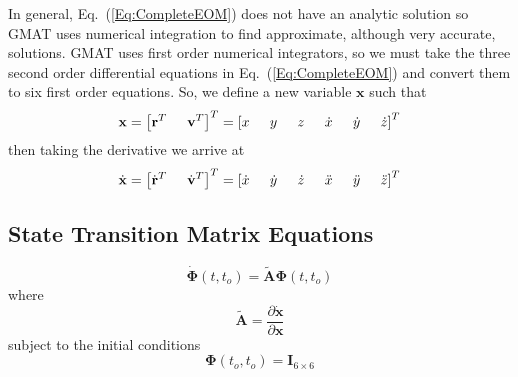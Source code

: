 In general, Eq.~(\ref{Eq:CompleteEOM}) does not have an analytic
solution so GMAT uses numerical integration to find approximate,
although very accurate, solutions.  GMAT uses first order
numerical integrators, so we must take the three second order
differential equations in Eq.~(\ref{Eq:CompleteEOM}) and convert
them to six first order equations.  So, we define a new variable
$\mathbf{x}$ such that
%
\begin{equation}
    \mathbf{x} = \left[\mbr^T \hspace{.2 in} \mbv^T  \right]^T = \left[x \hspace{.2 in} y \hspace{.2 in} z \hspace{.2 in} \dot{x} \hspace{.2 in}
    \dot{y} \hspace{.2 in} \dot{z}  \right]^T
\end{equation}
%
then taking the derivative we arrive at
%
\begin{equation}
    \dot{\mathbf{x}} = \left[\dot{\mbr}^T \hspace{.2 in} \dot{\mbv}^T  \right]^T = \left[\dot{x} \hspace{.2 in}
    \dot{y}
    \hspace{.2 in} \dot{z} \hspace{.2 in} \ddot{x} \hspace{.2 in}
    \ddot{y} \hspace{.2 in} \ddot{z}  \right]^T
\end{equation}

\subsection{State Transition Matrix Equations}

\begin{equation}
     \dot{\boldsymbol{\Phi}}(t,t_o) = \tilde{\mathbf{A}}\boldsymbol{\Phi}(t,t_o)
\end{equation}
%
where
%
\begin{equation}
     \tilde{\mathbf{A}} = \frac{\partial \dot{\mathbf{x}}}{\partial \mathbf{x}}
\end{equation}
%
subject to the initial conditions
%
\begin{equation}
     \boldsymbol{\Phi}(t_o,t_o) = \mathbf{I}_{6\times6}
\end{equation}


